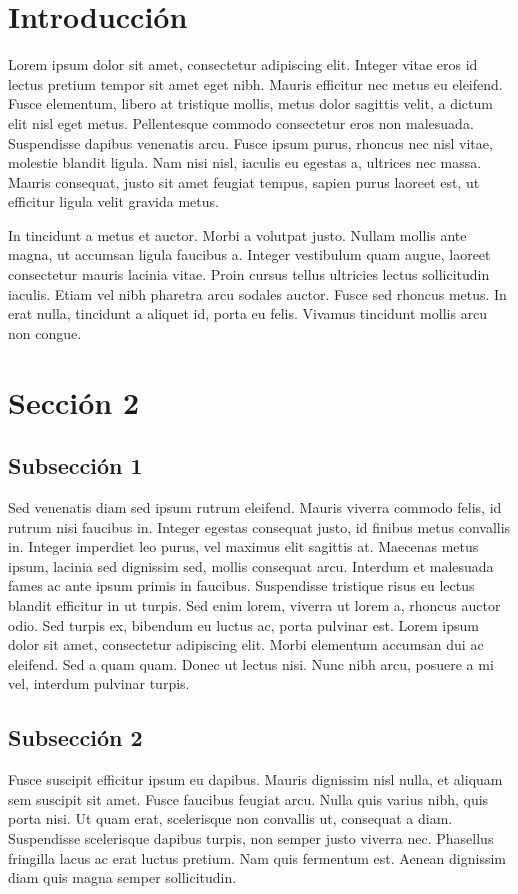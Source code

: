 \documentclass[12pt, twocolumn]{article}
\begin{document}
\section{Introducción}

Lorem ipsum dolor sit amet, consectetur adipiscing elit. Integer vitae eros id lectus pretium tempor sit amet eget nibh. Mauris efficitur nec metus eu eleifend. Fusce elementum, libero at tristique mollis, metus dolor sagittis velit, a dictum elit nisl eget metus. Pellentesque commodo consectetur eros non malesuada. Suspendisse dapibus venenatis arcu. Fusce ipsum purus, rhoncus nec nisl vitae, molestie blandit ligula. Nam nisi nisl, iaculis eu egestas a, ultrices nec massa. Mauris consequat, justo sit amet feugiat tempus, sapien purus laoreet est, ut efficitur ligula velit gravida metus.

In tincidunt a metus et auctor. Morbi a volutpat justo. Nullam mollis ante magna, ut accumsan ligula faucibus a. Integer vestibulum quam augue, laoreet consectetur mauris lacinia vitae. Proin cursus tellus ultricies lectus sollicitudin iaculis. Etiam vel nibh pharetra arcu sodales auctor. Fusce sed rhoncus metus. In erat nulla, tincidunt a aliquet id, porta eu felis. Vivamus tincidunt mollis arcu non congue.

\section{Sección 2}
\subsection{Subsección 1}

Sed venenatis diam sed ipsum rutrum eleifend. Mauris viverra commodo felis, id rutrum nisi faucibus in. Integer egestas consequat justo, id finibus metus convallis in. Integer imperdiet leo purus, vel maximus elit sagittis at. Maecenas metus ipsum, lacinia sed dignissim sed, mollis consequat arcu. Interdum et malesuada fames ac ante ipsum primis in faucibus. Suspendisse tristique risus eu lectus blandit efficitur in ut turpis. Sed enim lorem, viverra ut lorem a, rhoncus auctor odio. Sed turpis ex, bibendum eu luctus ac, porta pulvinar est. Lorem ipsum dolor sit amet, consectetur adipiscing elit. Morbi elementum accumsan dui ac eleifend. Sed a quam quam. Donec ut lectus nisi. Nunc nibh arcu, posuere a mi vel, interdum pulvinar turpis.

\subsection{Subsección 2}
Fusce suscipit efficitur ipsum eu dapibus. Mauris dignissim nisl nulla, et aliquam sem suscipit sit amet. Fusce faucibus feugiat arcu. Nulla quis varius nibh, quis porta nisi. Ut quam erat, scelerisque non convallis ut, consequat a diam. Suspendisse scelerisque dapibus turpis, non semper justo viverra nec. Phasellus fringilla lacus ac erat luctus pretium. Nam quis fermentum est. Aenean dignissim diam quis magna semper sollicitudin. 
\end{document}
